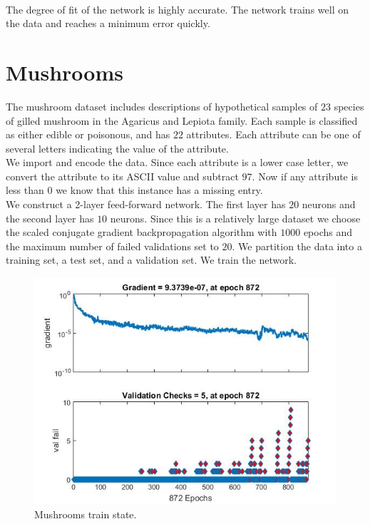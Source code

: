 \documentclass{article}%
\begin{document}
\\
The degree of fit of the network is highly accurate. The network trains well on the data and reaches a minimum error quickly.

\section{Mushrooms}
The mushroom dataset includes descriptions of hypothetical samples of $23$ species of gilled mushroom in the Agaricus and Lepiota family. Each sample is classified as either edible or poisonous, and has $22$ attributes. Each attribute can be one of several letters indicating the value of the attribute.
\\
We import and encode the data. Since each attribute is a lower case letter, we convert the attribute to its ASCII value and subtract $97$. Now if any attribute is less than $0$ we know that this instance has a missing entry.
\\
We construct a 2-layer feed-forward network. The first layer has $20$ neurons and the second layer has $10$ neurons. Since this is a relatively large dataset we choose the scaled conjugate gradient backpropagation algorithm with $1000$ epochs and the maximum number of failed validations set to $20$. We partition the data into a training set, a test set, and a validation set. We train the network.
\begin{figure}[H]
\centering
\includegraphics[scale=0.5]{Mushrooms/train_state.jpg}
\caption{Mushrooms train state.}
\label{fig:mushtrain}
\end{figure}
\\
\end{document}

